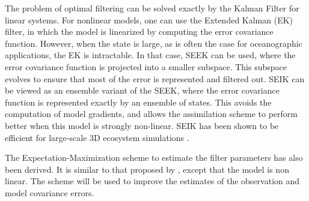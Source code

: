 The problem of optimal filtering can be solved exactly by the Kalman Filter for
linear systems. For nonlinear models, one can use the Extended Kalman (EK)
filter, in which the model is linearized by computing the error covariance
function.  However, when the state is large, as is often the case for
oceanographic applications, the EK is intractable. In that case, SEEK can be
used, where the error covariance function is projected into a smaller subspace.
This subspace evolves to ensure that most of the error is represented and
filtered out. SEIK can be viewed as an ensemble variant of the SEEK, where the
error covariance function is represented exactly by an ensemble of states. This
avoids the computation of model gradients, and allows the assimilation scheme
to perform better when this model is strongly non-linear. SEIK has been shown
to be efficient for large-scale 3D ecosystem simulations
\citep{Triantafyllou2003}.

The Expectation-Maximization scheme to estimate the filter parameters has also
been derived. It is similar to that proposed by \citet{Tandeo2014}, 
except that the model is non linear. The scheme will be used to improve
the estimates of the observation and model covariance errors.
